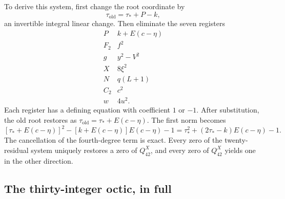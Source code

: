 To derive this system, first change the root coordinate by
\[
 \tau_{\mathrm{old}}=\tau_*+P-k,
\]
an invertible integral linear change. Then eliminate the seven registers
\[
 \begin{array}{c|l}
 P&k+E(c-\eta)\\
 F_2&f^2\\
 g&y^2-V^2\\
 X&8\xi^2\\
 N&q(L+1)\\
 C_2&c^2\\
 w&4u^2.
 \end{array}
\]
Each register has a defining equation with coefficient $1$ or $-1$.
After substitution, the old root restores as
$\tau_{\mathrm{old}}=\tau_*+E(c-\eta)$. The first norm becomes
\[
 [\tau_*+E(c-\eta)]^2
 -[k+E(c-\eta)]E(c-\eta)-1
 =\tau_*^2+(2\tau_*-k)E(c-\eta)-1.
\]
The cancellation of the fourth-degree term is exact. Every zero of the
twenty-residual system uniquely restores a zero of $Q_{42}^{X}$, and
every zero of $Q_{42}^{X}$ yields one in the other direction.

\subsection{The thirty-integer octic, in full}

